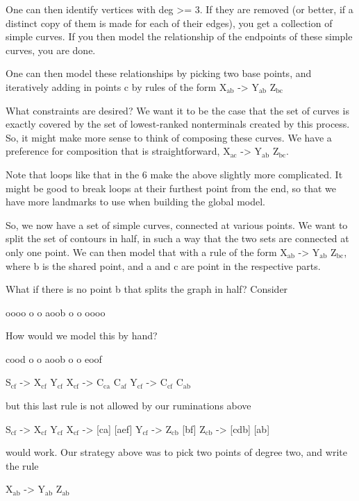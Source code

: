 \documentclass{book}
\begin{document}
One can then identify vertices with deg >= 3. If they are removed (or
better, if a distinct copy of them is made for each of their edges),
you get a collection of simple curves. If you then model the
relationship of the endpoints of these simple curves, you are done. 

One can then model these relationships by picking two base points, and
iteratively adding in points c by rules of the form 
X$_{\mathrm{ab}}$ -> Y$_{\mathrm{ab}}$ Z$_{\mathrm{bc}}$

What constraints are desired? We want it to be the case that the set
of curves is exactly covered by the set of lowest-ranked nonterminals
created by this process. So, it might make more sense to think of
composing these curves. We have a preference for composition that is
straightforward, X$_{\mathrm{ac}}$ -> Y$_{\mathrm{ab}}$ Z$_{\mathrm{bc}}$. 

Note that loops like that in the 6 make the above slightly more
complicated. It might be good to break loops at their furthest point
from the end, so that we have more landmarks to use when building the
global model.

So, we now have a set of simple curves, connected at various
points. We want to split the set of contours in half, in such a way
that the two sets are connected at only one point. We can then model
that with a rule of the form X$_{\mathrm{ab}}$ -> Y$_{\mathrm{ab}}$ Z$_{\mathrm{bc}}$, where b is the shared
point, and a and c are point in the respective parts.

What if there is no point b that splits the graph in half? Consider

oooo
o  o
aoob
o  o
oooo

How would we model this by hand?

cood
o  o
aoob
o  o
eoof

S$_{\mathrm{cf}}$ -> X$_{\mathrm{cf}}$ Y$_{\mathrm{cf}}$
X$_{\mathrm{cf}}$ -> C$_{\mathrm{ca}}$ C$_{\mathrm{af}}$
Y$_{\mathrm{cf}}$ -> C$_{\mathrm{cf}}$ C$_{\mathrm{ab}}$

but this last rule is not allowed by our ruminations above

S$_{\mathrm{cf}}$ -> X$_{\mathrm{cf}}$ Y$_{\mathrm{cf}}$
X$_{\mathrm{cf}}$ -> [ca] [aef]
Y$_{\mathrm{cf}}$ -> Z$_{\mathrm{cb}}$ [bf]
Z$_{\mathrm{cb}}$ -> [cdb] [ab]

would work. Our strategy above was to pick two points of degree two,
and write the rule

X$_{\mathrm{ab}}$ -> Y$_{\mathrm{ab}}$ Z$_{\mathrm{ab}}$
\end{document}
